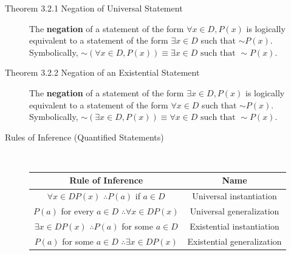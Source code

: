 \documentclass{article}
\begin{document}
\begin{description}
    \item[Theorem 3.2.1 Negation of Universal Statement] The \textbf{negation} of a statement of the form $\forall x\in D, P(x)$ is logically equivalent to a statement of the form $\exists x\in D$ such that ${\sim} P(x)$. Symbolically, ${\sim}(\forall x\in D, P(x)) \equiv \exists x\in D \text{ such that } {\sim} P(x)$.
    \item[Theorem 3.2.2 Negation of an Existential Statement] The \textbf{negation} of a statement of the form $\exists x\in D, P(x)$ is logically equivalent to a statement of the form $\forall x\in D$ such that ${\sim} P(x)$. Symbolically, ${\sim}(\exists x\in D, P(x)) \equiv \forall x\in D \text{ such that } {\sim} P(x)$.
    \item[Rules of Inference (Quantified Statements)] \
    \begin{table}[h]
        \centering
        {
        \begin{tabular}{|c|c|}
            \hline
             Rule of Inference & Name \\
             \hline
             $\forall x\in D P(x)$ \quad $\therefore P(a)$ if $a\in D$ & Universal instantiation \\
             $P(a)$ for every $a\in D$ \quad $\therefore \forall x\in D P(x)$ & Universal generalization \\
             $\exists x\in D P(x)$ \quad $\therefore P(a)$ for some $a\in D$ & Existential instantiation \\
             $P(a)$ for some $a\in D$ \quad  $\therefore \exists x\in D P(x)$ & 	Existential generalization \\
            \hline
        \end{tabular}}
        \label{tab:1}
    \end{table}


\end{description}
\end{document}

